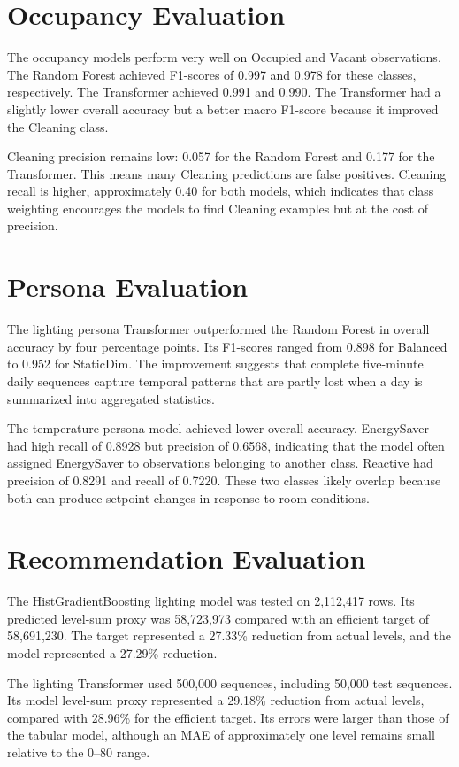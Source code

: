 \section{Occupancy Evaluation}

The occupancy models perform very well on Occupied and Vacant observations.
The Random Forest achieved F1-scores of 0.997 and 0.978 for these classes,
respectively. The Transformer achieved 0.991 and 0.990. The Transformer had a
slightly lower overall accuracy but a better macro F1-score because it improved
the Cleaning class.

Cleaning precision remains low: 0.057 for the Random Forest and 0.177 for the
Transformer. This means many Cleaning predictions are false positives.
Cleaning recall is higher, approximately 0.40 for both models, which indicates
that class weighting encourages the models to find Cleaning examples but at
the cost of precision.

\section{Persona Evaluation}

The lighting persona Transformer outperformed the Random Forest in overall
accuracy by four percentage points. Its F1-scores ranged from 0.898 for
Balanced to 0.952 for StaticDim. The improvement suggests that complete
five-minute daily sequences capture temporal patterns that are partly lost
when a day is summarized into aggregated statistics.

The temperature persona model achieved lower overall accuracy. EnergySaver had
high recall of 0.8928 but precision of 0.6568, indicating that the model often
assigned EnergySaver to observations belonging to another class. Reactive had
precision of 0.8291 and recall of 0.7220. These two classes likely overlap
because both can produce setpoint changes in response to room conditions.

\section{Recommendation Evaluation}

The HistGradientBoosting lighting model was tested on 2,112,417 rows. Its
predicted level-sum proxy was 58,723,973 compared with an efficient target of
58,691,230. The target represented a 27.33\% reduction from actual levels, and
the model represented a 27.29\% reduction.

The lighting Transformer used 500,000 sequences, including 50,000 test
sequences. Its model level-sum proxy represented a 29.18\% reduction from
actual levels, compared with 28.96\% for the efficient target. Its errors were
larger than those of the tabular model, although an MAE of approximately one
level remains small relative to the 0--80 range.

